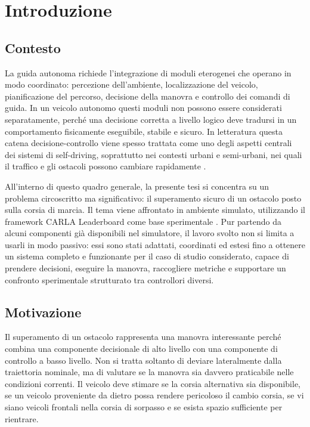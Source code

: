 \chapter{Introduzione}

\section{Contesto}

La guida autonoma richiede l'integrazione di moduli eterogenei che operano in modo coordinato: percezione dell'ambiente, localizzazione del veicolo, pianificazione del percorso, decisione della manovra e controllo dei comandi di guida. In un veicolo autonomo questi moduli non possono essere considerati separatamente, perché una decisione corretta a livello logico deve tradursi in un comportamento fisicamente eseguibile, stabile e sicuro. In letteratura questa catena decisione-controllo viene spesso trattata come uno degli aspetti centrali dei sistemi di self-driving, soprattutto nei contesti urbani e semi-urbani, nei quali il traffico e gli ostacoli possono cambiare rapidamente \cite{paden2016survey}.

All'interno di questo quadro generale, la presente tesi si concentra su un problema circoscritto ma significativo: il superamento sicuro di un ostacolo posto sulla corsia di marcia. Il tema viene affrontato in ambiente simulato, utilizzando il framework CARLA Leaderboard come base sperimentale \cite{dosovitskiy2017carla}. Pur partendo da alcuni componenti già disponibili nel simulatore, il lavoro svolto non si limita a usarli in modo passivo: essi sono stati adattati, coordinati ed estesi fino a ottenere un sistema completo e funzionante per il caso di studio considerato, capace di prendere decisioni, eseguire la manovra, raccogliere metriche e supportare un confronto sperimentale strutturato tra controllori diversi.

\section{Motivazione}

Il superamento di un ostacolo rappresenta una manovra interessante perché combina una componente decisionale di alto livello con una componente di controllo a basso livello. Non si tratta soltanto di deviare lateralmente dalla traiettoria nominale, ma di valutare se la manovra sia davvero praticabile nelle condizioni correnti. Il veicolo deve stimare se la corsia alternativa sia disponibile, se un veicolo proveniente da dietro possa rendere pericoloso il cambio corsia, se vi siano veicoli frontali nella corsia di sorpasso e se esista spazio sufficiente per rientrare.

